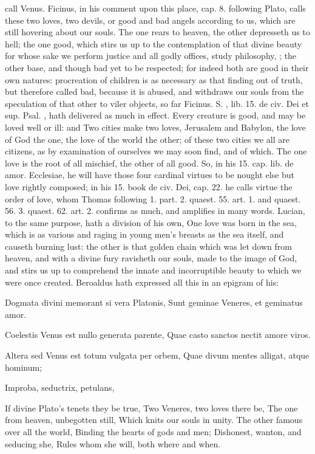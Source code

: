 {call Venus. Ficinus, in his comment upon this place, cap. 8. following
Plato, calls these two loves, two devils, or good and bad angels
according to us, which are still hovering about our souls. The
one rears to heaven, the other depresseth us to hell; the one good,
which stirs us up to the contemplation of that divine beauty for whose
sake we perform justice and all godly offices, study philosophy, \etc{};
the other base, and though bad yet to be respected; for indeed both are
good in their own natures: procreation of children is as necessary as
that finding out of truth, but therefore called bad, because it is
abused, and withdraws our souls from the speculation of that other to
viler objects, so far Ficinus. S. \Austin{}, lib. 15. de civ. Dei et sup.
Psal. , hath delivered as much in effect. Every creature is
good, and may be loved well or ill: and Two cities make two
loves, Jerusalem and Babylon, the love of God the one, the love of the
world the other; of these two cities we all are citizens, as by
examination of ourselves we may soon find, and of which. The one love
is the root of all mischief, the other of all good. So, in his 15. cap.
lib. de amor. Ecclesiae, he will have those four cardinal virtues to be
nought else but love rightly composed; in his 15. book de civ. Dei,
cap. 22. he calls virtue the order of love, whom Thomas following 1.
part. 2. quaest. 55. art. 1. and quaest. 56. 3. quaest. 62. art. 2.
confirms as much, and amplifies in many words. Lucian, to the
same purpose, hath a division of his own, One love was born in the sea,
which is as various and raging in young men's breasts as the sea
itself, and causeth burning lust: the other is that golden chain which
was let down from heaven, and with a divine fury ravisheth our souls,
made to the image of God, and stirs us up to comprehend the innate and
incorruptible beauty to which we were once created. Beroaldus hath
expressed all this in an epigram of his:

Dogmata divini memorant si vera Platonis,
Sunt geminae Veneres, et geminatus amor.

Coelestis Venus est nullo generata parente,
Quae casto sanctos nectit amore viros.

Altera sed Venus est totum vulgata per orbem,
Quae divum mentes alligat, atque hominum;

Improba, seductrix, petulans, \etc{}

If divine Plato's tenets they be true,
Two Veneres, two loves there be,
The one from heaven, unbegotten still,
Which knits our souls in unity.
The other famous over all the world,
Binding the hearts of gods and men;
Dishonest, wanton, and seducing she,
Rules whom she will, both where and when.

}
